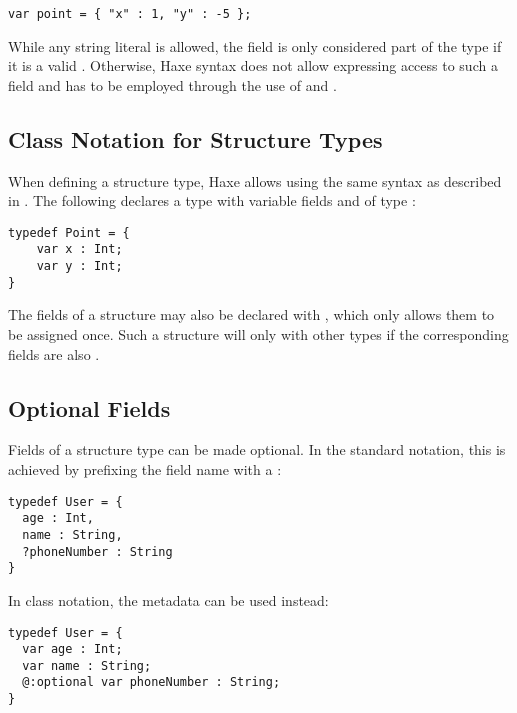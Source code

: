\begin{lstlisting}
var point = { "x" : 1, "y" : -5 };
\end{lstlisting}
While any string literal is allowed, the field is only considered part of the type if it is a valid . Otherwise, Haxe syntax does not allow expressing access to such a field and  has to be employed through the use of  and .

\subsection{Class Notation for Structure Types}
\label{types-structure-class-notation}

When defining a structure type, Haxe allows using the same syntax as described in . The following  declares a  type with variable fields  and  of type :

\begin{lstlisting}
typedef Point = {
    var x : Int;
    var y : Int;
}
\end{lstlisting}


The fields of a structure may also be declared with , which only allows them to be assigned once. Such a structure will only  with other types if the corresponding fields are also .


\subsection{Optional Fields}
\label{types-structure-optional-fields}

Fields of a structure type can be made optional. In the standard notation, this is achieved by prefixing the field name with a :

\begin{lstlisting}
typedef User = {
  age : Int,
  name : String,
  ?phoneNumber : String
}
\end{lstlisting}

In class notation, the  metadata can be used instead:

\begin{lstlisting}
typedef User = {
  var age : Int;
  var name : String;
  @:optional var phoneNumber : String;
}
\end{lstlisting}

